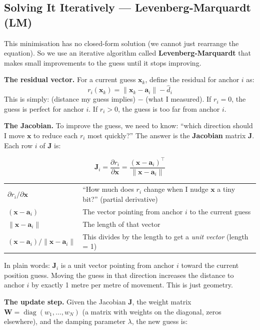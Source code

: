 \documentclass[11pt,a4paper]{article}
\newcommand{\vect}[1]{\bm{#1}}
\newcommand{\mat}[1]{\mathbf{#1}}
\DeclareMathOperator{\diag}{diag}
\begin{document}
\subsection{Solving It Iteratively --- Levenberg-Marquardt (LM)}

This minimisation has no closed-form solution (we cannot just rearrange the equation). So we use an iterative algorithm called \textbf{Levenberg-Marquardt} that makes small improvements to the guess until it stops improving.

\textbf{The residual vector.} For a current guess $\vect{x}_k$, define the residual for anchor $i$ as:
\[
r_i(\vect{x}_k) = \|\vect{x}_k - \vect{a}_i\| - \hat{d}_i
\]
This is simply: (distance my guess implies) $-$ (what I measured). If $r_i = 0$, the guess is perfect for anchor $i$. If $r_i > 0$, the guess is too far from anchor $i$.

\textbf{The Jacobian.} To improve the guess, we need to know: ``which direction should I move $\vect{x}$ to reduce each $r_i$ most quickly?'' The answer is the \textbf{Jacobian} matrix $\mat{J}$. Each row $i$ of $\mat{J}$ is:

\begin{equation}
\mat{J}_i = \frac{\partial r_i}{\partial \vect{x}} = \frac{(\vect{x} - \vect{a}_i)^\top}{\|\vect{x} - \vect{a}_i\|}
\label{eq:jacobian}
\end{equation}

\begin{symbols}
\begin{tabular}{ll}
$\partial r_i / \partial \vect{x}$ & ``How much does $r_i$ change when I nudge $\vect{x}$ a tiny bit?'' (partial derivative) \\
$(\vect{x} - \vect{a}_i)$ & The vector pointing from anchor $i$ to the current guess \\
$\|\vect{x} - \vect{a}_i\|$ & The length of that vector \\
$(\vect{x} - \vect{a}_i) / \|\vect{x}-\vect{a}_i\|$ & This divides by the length to get a \emph{unit vector} (length = 1) \\
\end{tabular}
\end{symbols}

In plain words: $\mat{J}_i$ is a unit vector pointing from anchor $i$ toward the current position guess. Moving the guess in that direction increases the distance to anchor $i$ by exactly 1 metre per metre of movement. This is just geometry.

\textbf{The update step.} Given the Jacobian $\mat{J}$, the weight matrix $\mat{W} = \diag(w_1, \ldots, w_N)$ (a matrix with weights on the diagonal, zeros elsewhere), and the damping parameter $\lambda$, the new guess is:
\end{document}
